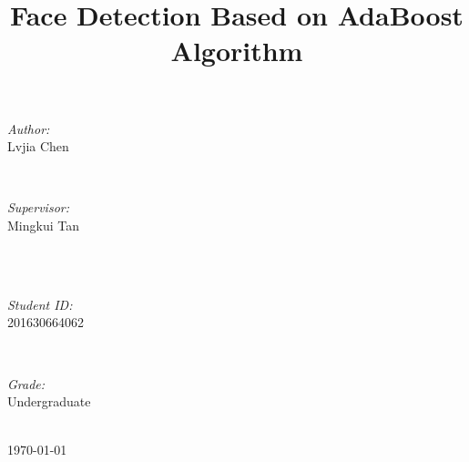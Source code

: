 \documentclass[journal, a4paper]{IEEEtran}
\begin{document}
\begin{titlepage}
\begin{minipage}{0.4\textwidth}
\begin{flushleft} \large
\emph{Author:}\\
Lvjia Chen %
\end{flushleft}
\end{minipage}
~
\begin{minipage}{0.4\textwidth}
\begin{flushright} \large
\emph{Supervisor:} \\
Mingkui Tan %
\end{flushright}
\end{minipage}\\[2cm]
~
\begin{minipage}{0.4\textwidth}
\begin{flushleft} \large
\emph{Student ID:}\\
201630664062
\end{flushleft}
\end{minipage}
~
\begin{minipage}{0.4\textwidth}
\begin{flushright} \large
\emph{Grade:} \\
Undergraduate
\end{flushright}
\end{minipage}\\[2cm]



{\large \today}\\[2cm] %

 

\vfill %

\end{titlepage}

	\title{Face Detection Based on AdaBoost Algorithm}
	\maketitle
\end{document}
